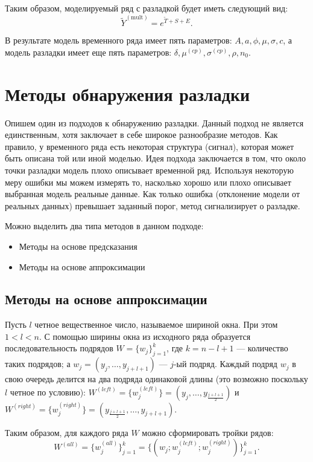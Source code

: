 \documentclass[%
12pt,
master,  %
natbib,      %
subf,        %
substylefile = spbu.rtx,
href,        %
colorlinks,  %
]{disser}
\begin{document}
Таким образом, моделируемый ряд с разладкой будет иметь следующий вид:
$$ \tilde{Y}^{\mathrm{(mult)}} = e^{\tilde{T} + S + E}. $$

В результате модель временного ряда имеет пять параметров: $ A, a, \phi, \mu, \sigma, c $, а модель разладки имеет еще пять параметров: $ \delta, \mu^{(cp)}, \sigma^{(cp)}, \rho, n_0 $.

\section{Методы обнаружения разладки}


Опишем один из подходов к обнаружению разладки. Данный подход не является единственным, хотя заключает в себе широкое разнообразие методов. Как правило, у временного ряда есть некоторая структура (сигнал), которая может быть описана той или иной моделью. Идея подхода заключается в том, что около точки разладки модель плохо описывает временной ряд. Используя некоторую меру ошибки мы можем измерять то, насколько хорошо или плохо описывает выбранная модель реальные данные. Как только ошибка (отклонение модели от реальных данных) превышает заданный порог, метод сигнализирует о разладке.

Можно выделить два типа методов в данном подходе:
\begin{itemize}
	\item Методы на основе предсказания
	\item Методы на основе аппроксимации
\end{itemize}

\subsection{Методы на основе аппроксимации}

Пусть $l$ четное вещественное число, называемое шириной окна. При этом  $ 1 < l < n $. С помощью ширины окна из исходного ряда образуется последовательность подрядов $W = \{ w_j \}_{j=1}^k$, где $k = n - l + 1$ --- количество таких подрядов; а $ w_j = (y_j, \dots, y_{j+l+1}) $ --- $j$-ый подряд. Каждый подряд  $w_j$  в свою очередь делится на два подряда одинаковой длины (это возможно поскольку $l$ четное по условию): $ W^{(left)} = \{w_j^{(left)} \}  =  (y_j, \dots, y_{\frac{j+l+1}{2}})$ и $W^{(right)} = \{w_j^{(right)} \} = (y_{\frac{j+l+1}{2}}, \dots, y_{j+l+1})$.

Таким образом, для каждого ряда $W$ можно сформировать тройки рядов: 
$$ W^{(all)} = \{w_j^{(all)} \}_{j=1}^k =  \{(w_j; w_j^{(left)}; w_j^{(right)}) \}_{j=1}^k. $$
\end{document}

